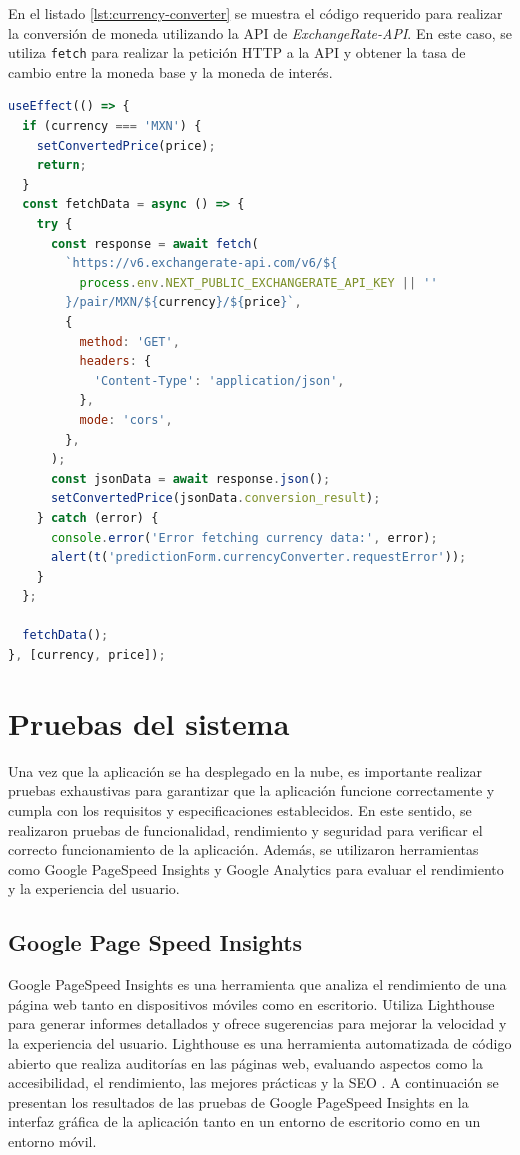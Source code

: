 En el listado \ref{lst:currency-converter} se muestra el código requerido para
realizar la conversión de moneda utilizando la API de \textit{ExchangeRate-API}.
En este caso, se utiliza \texttt{fetch} para realizar la petición
HTTP a la API y obtener la tasa de cambio entre la moneda base y la moneda de
interés.

\begin{lstlisting}[language=javascript, caption={Conversión de moneda utilizando la API de ExchangeRate-API}, label={lst:currency-converter}]
useEffect(() => {
  if (currency === 'MXN') {
    setConvertedPrice(price);
    return;
  }
  const fetchData = async () => {
    try {
      const response = await fetch(
        `https://v6.exchangerate-api.com/v6/${
          process.env.NEXT_PUBLIC_EXCHANGERATE_API_KEY || ''
        }/pair/MXN/${currency}/${price}`,
        {
          method: 'GET',
          headers: {
            'Content-Type': 'application/json',
          },
          mode: 'cors',
        },
      );
      const jsonData = await response.json();
      setConvertedPrice(jsonData.conversion_result);
    } catch (error) {
      console.error('Error fetching currency data:', error);
      alert(t('predictionForm.currencyConverter.requestError'));
    }
  };

  fetchData();
}, [currency, price]);
\end{lstlisting}

\section{Pruebas del sistema}
Una vez que la aplicación se ha desplegado en la nube, es importante realizar
pruebas exhaustivas para garantizar que la aplicación funcione correctamente y
cumpla con los requisitos y especificaciones establecidos. En este sentido, se
realizaron pruebas de funcionalidad, rendimiento y seguridad para verificar el
correcto funcionamiento de la aplicación. Además, se utilizaron herramientas
como Google PageSpeed Insights y Google Analytics para evaluar el rendimiento
y la experiencia del usuario.

\subsection{Google Page Speed Insights}
Google PageSpeed Insights es una herramienta que analiza el rendimiento de una
página web tanto en dispositivos móviles como en escritorio. Utiliza Lighthouse
para generar informes detallados y ofrece sugerencias para mejorar la velocidad
y la experiencia del usuario. Lighthouse es una herramienta automatizada de
código abierto que realiza auditorías en las páginas web, evaluando aspectos
como la accesibilidad, el rendimiento, las mejores prácticas y la SEO \cite{google_pagespeed_insights}.
A continuación se presentan los resultados de las pruebas de Google PageSpeed Insights
en la interfaz gráfica de la aplicación tanto en un entorno de escritorio como en
un entorno móvil.

